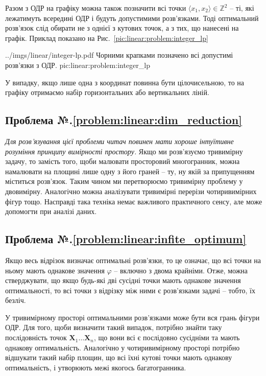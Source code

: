 \documentclass[\main/book.tex]{subfiles}
\begin{document}
Разом з ОДР на графіку можна також позначити всі точки $\langle x_1, x_2 \rangle \in \mathbb{Z}^2$ -- ті, які лежатимуть всередині ОДР і будуть допустимими розв'язками. Тоді оптимальний розв'язок слід обирати не з однієї з кутових точок, а з тих, що нанесені на графік. Приклад показано на Рис.~\ref{pic:linear:problem:integer_lp}

\illustration
 {../imgs/linear/integer-lp.pdf}
 {Чорними крапками позначено всі допустимі розв'язки з ОДР.}
 {pic:linear:problem:integer_lp}

У випадку, якщо лише одна з координат повинна бути цілочисельною, то на графіку отримаємо набір горизонтальних або вертикальних ліній.

\subsection*{Проблема №.\ref{problem:linear:dim_reduction}}

\textit{Для розв'язування цієї проблеми читач повинен мати хороше інтуїтивне розуміння принципу вимірності простору.} Якщо ми розв'язуємо тривимірну задачу, то замість того, щоби малювати просторовий многогранник, можна намалювати на площині лише одну з його граней -- ту, ну якій за припущенням міститься розв'язок. Таким чином ми перетворюємо тривимірну проблему у двовимірну. Аналогічно можна аналізувати тривимірні перерізи чотиривимірних фігур тощо. Насправді така техніка немає важливого практичного сенсу, але може допомогти при аналізі даних.

\subsection*{Проблема №.\ref{problem:linear:infite_optimum}}

Якщо весь відрізок визначає оптимальні розв'язки, то це означає, що всі точки на ньому мають однакове значення $\varphi$ -- включно з двома крайніми. Отже, можна стверджувати, що якщо будь-які дві сусідні точки мають однакове значення оптимальності, то всі точки з відрізку між ними є розв'язками задачі -- тобто, їх безліч.

У тривимірному просторі оптимальними розв'язками може бути вся грань фігури ОДР. Для того, щоби визначити такий випадок, потрібно знайти таку послідовність точок $\mathbf{X}_1 \ldots \mathbf{X}_n$, що вони всі є послідовно сусідніми та мають однакову оптимальність. Аналогічно у чотиривимірному просторі потрібно відшукати такий набір площин, що всі їхні кутові точки мають однакову оптимальність, і утворюють межі якогось багатогранника.
\end{document}
